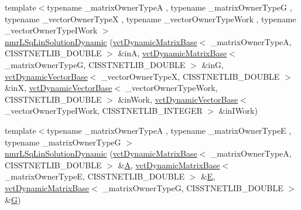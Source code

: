 \begin{DoxyCompactItemize}
\item 
{\footnotesize template$<$typename \-\_\-matrix\-Owner\-Type\-A , typename \-\_\-matrix\-Owner\-Type\-G , typename \-\_\-vector\-Owner\-Type\-X , typename \-\_\-vector\-Owner\-Type\-Work , typename \-\_\-vector\-Owner\-Type\-I\-Work $>$ }\\\hyperlink{classnmr_l_sq_lin_solution_dynamic_ac47585ee9ead0c00d8bb36e458a9a7d9}{nmr\-L\-Sq\-Lin\-Solution\-Dynamic} (\hyperlink{classvct_dynamic_matrix_base}{vct\-Dynamic\-Matrix\-Base}$<$ \-\_\-matrix\-Owner\-Type\-A, C\-I\-S\-S\-T\-N\-E\-T\-L\-I\-B\-\_\-\-D\-O\-U\-B\-L\-E $>$ \&in\-A, \hyperlink{classvct_dynamic_matrix_base}{vct\-Dynamic\-Matrix\-Base}$<$ \-\_\-matrix\-Owner\-Type\-G, C\-I\-S\-S\-T\-N\-E\-T\-L\-I\-B\-\_\-\-D\-O\-U\-B\-L\-E $>$ \&in\-G, \hyperlink{classvct_dynamic_vector_base}{vct\-Dynamic\-Vector\-Base}$<$ \-\_\-vector\-Owner\-Type\-X, C\-I\-S\-S\-T\-N\-E\-T\-L\-I\-B\-\_\-\-D\-O\-U\-B\-L\-E $>$ \&in\-X, \hyperlink{classvct_dynamic_vector_base}{vct\-Dynamic\-Vector\-Base}$<$ \-\_\-vector\-Owner\-Type\-Work, C\-I\-S\-S\-T\-N\-E\-T\-L\-I\-B\-\_\-\-D\-O\-U\-B\-L\-E $>$ \&in\-Work, \hyperlink{classvct_dynamic_vector_base}{vct\-Dynamic\-Vector\-Base}$<$ \-\_\-vector\-Owner\-Type\-I\-Work, C\-I\-S\-S\-T\-N\-E\-T\-L\-I\-B\-\_\-\-I\-N\-T\-E\-G\-E\-R $>$ \&in\-I\-Work)
\item 
{\footnotesize template$<$typename \-\_\-matrix\-Owner\-Type\-A , typename \-\_\-matrix\-Owner\-Type\-E , typename \-\_\-matrix\-Owner\-Type\-G $>$ }\\\hyperlink{classnmr_l_sq_lin_solution_dynamic_aff885544cd953fd22a27c7f71b8d6d07}{nmr\-L\-Sq\-Lin\-Solution\-Dynamic} (\hyperlink{classvct_dynamic_matrix_base}{vct\-Dynamic\-Matrix\-Base}$<$ \-\_\-matrix\-Owner\-Type\-A, C\-I\-S\-S\-T\-N\-E\-T\-L\-I\-B\-\_\-\-D\-O\-U\-B\-L\-E $>$ \&\hyperlink{classnmr_l_sq_lin_solution_dynamic_aa4a41abac141e2e55dd5cafb59169dfd}{A}, \hyperlink{classvct_dynamic_matrix_base}{vct\-Dynamic\-Matrix\-Base}$<$ \-\_\-matrix\-Owner\-Type\-E, C\-I\-S\-S\-T\-N\-E\-T\-L\-I\-B\-\_\-\-D\-O\-U\-B\-L\-E $>$ \&\hyperlink{classnmr_l_sq_lin_solution_dynamic_a7c1ac112b07f3edd33d348fe0a40fb71}{E}, \hyperlink{classvct_dynamic_matrix_base}{vct\-Dynamic\-Matrix\-Base}$<$ \-\_\-matrix\-Owner\-Type\-G, C\-I\-S\-S\-T\-N\-E\-T\-L\-I\-B\-\_\-\-D\-O\-U\-B\-L\-E $>$ \&\hyperlink{classnmr_l_sq_lin_solution_dynamic_a399cb314fb848d36f58c14830bad0c28}{G})
\item 

\end{DoxyCompactItemize}
